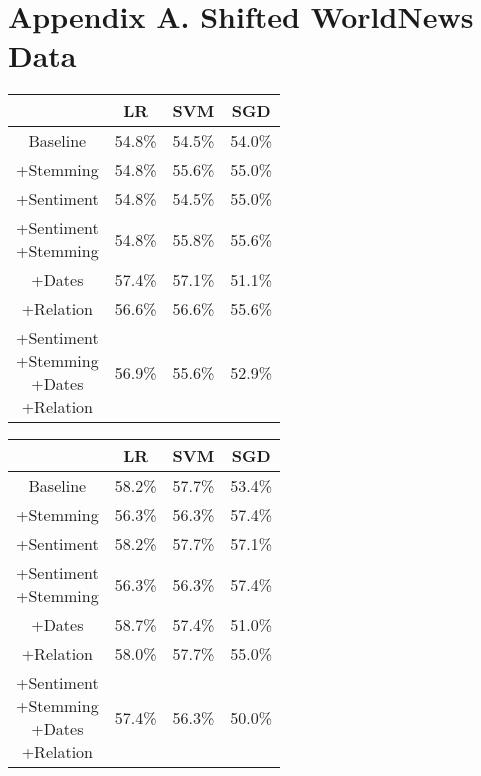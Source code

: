 \documentclass[11pt,a4paper]{article}
\begin{document}
\section{Appendix A. Shifted WorldNews Data}

\begin{center}
\begin{tabular}{ |c|c|c|c| }
 \hline
  & LR & SVM & SGD \\
  \hline
  Baseline & 54.8\% & 54.5\% & 54.0\% \\
  \hline
 +Stemming & 54.8\% & 55.6\% & 55.0\% \\
  \hline
 +Sentiment & 54.8\% & 54.5\%  & 55.0\% \\
  \hline
  \shortstack{+Sentiment \\ +Stemming} & 54.8\% & 55.8\% & 55.6\%\\
 \hline
 +Dates & 57.4\% & 57.1\% & 51.1\% \\
  \hline
 +Relation & 56.6\%& 56.6\% & 55.6\% \\
  \hline
  \shortstack{+Sentiment \\ +Stemming \\+Dates \\+Relation} & 56.9\% & 55.6\% & 52.9\% \\
 \hline
\end{tabular}
\end{center}

\vspace{40mm}
\begin{center}
\begin{tabular}{ |c|c|c|c| }
 \hline
  & LR & SVM & SGD \\
  \hline
  Baseline & 58.2\% & 57.7\% & 53.4\% \\
  \hline
 +Stemming & 56.3\% & 56.3\% & 57.4\% \\
  \hline
 +Sentiment & 58.2\% & 57.7\% & 57.1\% \\
  \hline
  \shortstack{+Sentiment \\ +Stemming} & 56.3\% & 56.3\% & 57.4\%\\
 \hline
 +Dates & 58.7\% & 57.4\% & 51.0\% \\
  \hline
 +Relation & 58.0\% & 57.7\% & 55.0\% \\
  \hline
  \shortstack{+Sentiment \\ +Stemming \\+Dates \\+Relation} & 57.4\% & 56.3\% & 50.0\% \\
 \hline
\end{tabular}
\end{center}
\end{document}
